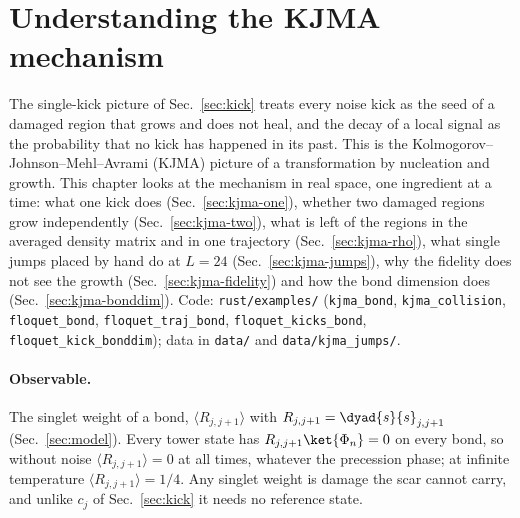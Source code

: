 \section{Understanding the KJMA mechanism}
\label{sec:kjma}

The single-kick picture of Sec.~\ref{sec:kick} treats every noise kick as the seed of a damaged region that grows and does not heal, and the decay of a local signal as the probability that no kick has happened in its past. This is the Kolmogorov--Johnson--Mehl--Avrami (KJMA) picture of a transformation by nucleation and growth. This chapter looks at the mechanism in real space, one ingredient at a time: what one kick does (Sec.~\ref{sec:kjma-one}), whether two damaged regions grow independently (Sec.~\ref{sec:kjma-two}), what is left of the regions in the averaged density matrix and in one trajectory (Sec.~\ref{sec:kjma-rho}), what single jumps placed by hand do at $L = 24$ (Sec.~\ref{sec:kjma-jumps}), why the fidelity does not see the growth (Sec.~\ref{sec:kjma-fidelity}) and how the bond dimension does (Sec.~\ref{sec:kjma-bonddim}). Code: \texttt{rust/examples/} (\texttt{kjma\_bond}, \texttt{kjma\_collision}, \texttt{floquet\_bond}, \texttt{floquet\_traj\_bond}, \texttt{floquet\_kicks\_bond}, \texttt{floquet\_kick\_bonddim}); data in \texttt{data/} and \texttt{data/kjma\_jumps/}.

\paragraph{Observable.} The singlet weight of a bond, $\langle R_{j,j+1}\rangle$ with $R_{j,j+1} = \dyad{s}{s}_{j,j+1}$ (Sec.~\ref{sec:model}). Every tower state has $R_{j,j+1}\ket{\Phi_n} = 0$ on every bond, so without noise $\langle R_{j,j+1}\rangle = 0$ at all times, whatever the precession phase; at infinite temperature $\langle R_{j,j+1}\rangle = 1/4$. Any singlet weight is damage the scar cannot carry, and unlike $c_j$ of Sec.~\ref{sec:kick} it needs no reference state.

